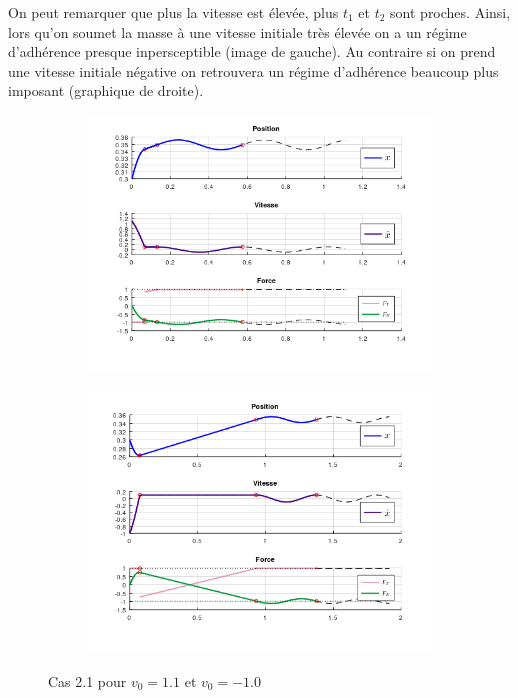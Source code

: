 \documentclass{article}
\begin{document}
On peut remarquer que plus la vitesse est élevée, plus $t_1$ et $t_2$ sont proches. Ainsi, lors qu'on soumet la masse à  une vitesse initiale très élevée on a un régime d'adhérence presque inpersceptible (image de gauche). Au contraire si on prend une vitesse initiale négative on retrouvera un régime d'adhérence beaucoup plus imposant (graphique de droite).
\begin{figure}[h!]
  \centering
  \hspace{-3cm}
  \begin{subfigure}[b]{.4\textwidth}
    \includegraphics[width = 1.5\linewidth]{CAS2_1a.png}
  \end{subfigure}
  \hspace{2.5cm}
  \begin{subfigure}[b]{.4\textwidth}
    \includegraphics[width = 1.5\linewidth]{CAS2_1b.png}
  \end{subfigure}
  \caption{Cas 2.1 pour $v_0 = 1.1$ et $v_0 = -1.0$}
\end{figure}
\end{document}
